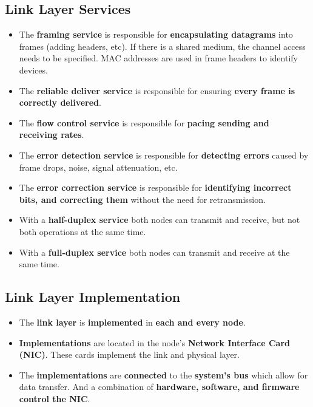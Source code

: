 \documentclass{article}
\begin{document}
    \subsection*{Link Layer Services}
    \begin{itemize}
        \item The \textbf{framing service} is responsible for \textbf{encapsulating datagrams} into frames (adding headers, etc). If there is a shared medium, the channel access needs to be specified. MAC addresses are used in frame headers to identify devices.
        \item The \textbf{reliable deliver service} is responsible for ensuring \textbf{every frame is correctly delivered}.
        \item The \textbf{flow control service} is responsible for \textbf{pacing sending and receiving rates}.
        \item The \textbf{error detection service} is responsible for \textbf{detecting errors} caused by frame drops, noise, signal attenuation, etc.
        \item The \textbf{error correction service} is responsible for \textbf{identifying incorrect bits, and correcting them} without the need for retransmission.
        \item With a \textbf{half-duplex service} both nodes can transmit and receive, but not both operations at the same time.
        \item With a \textbf{full-duplex service} both nodes can transmit and receive at the same time.
    \end{itemize}

    \subsection*{Link Layer Implementation}
    \begin{itemize}
        \item The \textbf{link layer} is \textbf{implemented} in \textbf{each and every node}.
        \item \textbf{Implementations} are located in the node's \textbf{Network Interface Card (NIC)}. These cards implement the link and physical layer.
        \item The \textbf{implementations} are \textbf{connected} to the \textbf{system's bus} which allow for data transfer. And a combination of \textbf{hardware, software, and firmware control the NIC}.
    \end{itemize}
\end{document}
